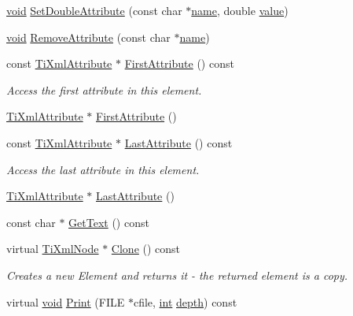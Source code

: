 \begin{DoxyCompactItemize}
\item 
\hyperlink{wglew_8h_aeea6e3dfae3acf232096f57d2d57f084}{void} \hyperlink{class_ti_xml_element_a0d1dd975d75496778177e35abfe0ec0b}{Set\-Double\-Attribute} (const char $\ast$\hyperlink{fmod__codec_8h_a5c4947d4516dd7cfa3505ce3a648a4ef}{name}, double \hyperlink{fmod__dsp_8h_a6a4f8a1a444e9080b297963b3db29fe0}{value})
\item 
\hyperlink{wglew_8h_aeea6e3dfae3acf232096f57d2d57f084}{void} \hyperlink{class_ti_xml_element_a56979767deca794376b1dfa69a525b2a}{Remove\-Attribute} (const char $\ast$\hyperlink{fmod__codec_8h_a5c4947d4516dd7cfa3505ce3a648a4ef}{name})
\item 
const \hyperlink{class_ti_xml_attribute}{Ti\-Xml\-Attribute} $\ast$ \hyperlink{class_ti_xml_element_a516054c9073647d6cb29b6abe9fa0592}{First\-Attribute} () const 
\begin{DoxyCompactList}\small\item\em Access the first attribute in this element. \end{DoxyCompactList}\item 
\hyperlink{class_ti_xml_attribute}{Ti\-Xml\-Attribute} $\ast$ \hyperlink{class_ti_xml_element_a4b33780fc565d38d6b54f640e0cf1737}{First\-Attribute} ()
\item 
const \hyperlink{class_ti_xml_attribute}{Ti\-Xml\-Attribute} $\ast$ \hyperlink{class_ti_xml_element_a86191b49f9177be132b85b14655f1381}{Last\-Attribute} () const 
\begin{DoxyCompactList}\small\item\em Access the last attribute in this element. \end{DoxyCompactList}\item 
\hyperlink{class_ti_xml_attribute}{Ti\-Xml\-Attribute} $\ast$ \hyperlink{class_ti_xml_element_a222f81cf06155cd108f2a68d4d176004}{Last\-Attribute} ()
\item 
const char $\ast$ \hyperlink{class_ti_xml_element_af3282294986cdb216646ea1f67af2c87}{Get\-Text} () const 
\item 
virtual \hyperlink{class_ti_xml_node}{Ti\-Xml\-Node} $\ast$ \hyperlink{class_ti_xml_element_aa464535ea1994db337cb6a8ce4b588b5}{Clone} () const 
\begin{DoxyCompactList}\small\item\em Creates a new Element and returns it -\/ the returned element is a copy. \end{DoxyCompactList}\item 
virtual \hyperlink{wglew_8h_aeea6e3dfae3acf232096f57d2d57f084}{void} \hyperlink{class_ti_xml_element_afbf52736e70fc91ec9d760721d6f4fd2}{Print} (F\-I\-L\-E $\ast$cfile, \hyperlink{wglew_8h_a500a82aecba06f4550f6849b8099ca21}{int} \hyperlink{glew_8h_a1c814629538debe12a7bfe2509a3671e}{depth}) const 

\end{DoxyCompactItemize}
